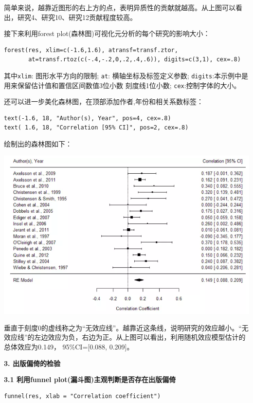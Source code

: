 \documentclass[
]{book}
\begin{document}
简单来说，越靠近图形的右上方的点，表明异质性的贡献就越高。从上图可以看出，研究4、研究10、研究12贡献程度较高。

接下来利用forest plot(森林图)可视化元分析的每个研究的影响大小：

\begin{verbatim}
forest(res, xlim=c(-1.6,1.6), atransf=transf.ztor,
       at=transf.rtoz(c(-.4,-.2,0,.2,.4,.6)), digits=c(3,1), cex=.8)
\end{verbatim}

其中\texttt{xlim}: 图形水平方向的限制; \texttt{at}: 横轴坐标及标签定义参数; \texttt{digits}:本示例中是用来保留估计值和置信区间数值3位小数 刻度线1位小数; \texttt{cex}:控制字体的大小。

还可以进一步美化森林图，在顶部添加作者,年份和相关系数标签：

\begin{verbatim}
text(-1.6, 18, "Author(s), Year", pos=4, cex=.8)
text( 1.6, 18, "Correlation [95% CI]", pos=2, cex=.8)
\end{verbatim}

绘制出的森林图如下：

\includegraphics{figs/3222.png}

垂直于刻度0的虚线称之为``无效应线''。越靠近这条线，说明研究的效应越小。``无效应线''的左边效应为负，右边为正。从上图可以看出，利用随机效应模型估计的总体效应为0.149， 95\%CI={[}0.088, 0.209{]}。

\textbf{3. 出版偏倚的检验}

\textbf{3.1 利用funnel plot(漏斗图)主观判断是否存在出版偏倚}

\begin{verbatim}
funnel(res, xlab = "Correlation coefficient")
\end{verbatim}
\end{document}
